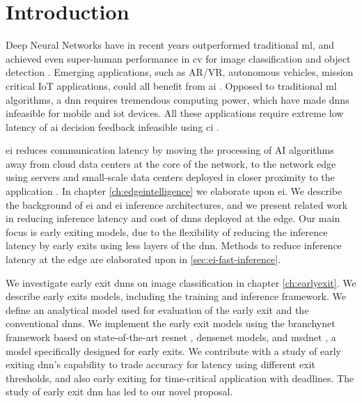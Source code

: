 \hypertarget{introduction}{%
\chapter{Introduction}\label{ch:introduction}}

Deep Neural Networks have in recent years outperformed traditional \gls{ml}, and achieved even super-human performance in \gls{cv} for image classification and object detection \cite{russakovsky_imagenet_2015}. Emerging applications, such as AR/VR, autonomous vehicles, mission critical IoT applications, could all benefit from \gls{ai} \cite{pettey_immersive_2018}. Opposed to traditional \gls{ml} algorithms, a \gls{dnn} requires tremendous computing power, which have made \gls{dnn}s infeasible for mobile and \gls{iot} devices. All these applications require extreme low latency of \gls{ai} decision feedback infeasible using \gls{ci} \cite{zhou_edge_2019}. 

\acrlong{ei} reduces communication latency by moving the processing of AI algorithms away from cloud data centers at the core of the network, to the network edge using servers and small-scale data centers deployed in closer proximity to the application \cite{shi_edge_2016}. In chapter \ref{ch:edgeintelligence} we elaborate upon \gls{ei}. We describe the background of \gls{ei} and \gls{ei} inference architectures, and we present related work in reducing inference latency and cost of \gls{dnn}s deployed at the edge. Our main focus is early exiting models, due to the flexibility of reducing the inference latency by early exits using less layers of the \gls{dnn}. Methods to reduce inference latency at the edge are elaborated upon in \ref{sec:ei-fast-inference}. 

We investigate early exit \gls{dnn}s on image classification in chapter \ref{ch:earlyexit}. We describe early exits models, including the training and inference framework. We define an analytical model used for evaluation of the early exit and the conventional \gls{dnn}s. We implement the early exit models using the \gls{branchynet} framework \cite{teerapittayanon_branchynet:_2016} based on state-of-the-art \gls{resnet} \cite{he_deep_2015}, \gls{densenet} \cite{huang_densely_2016} models, and \gls{msdnet} \cite{huang_multi-scale_2017}, a model specifically designed for early exits. We contribute with a study of early exiting \gls{dnn}'s capability to trade accuracy for latency using different exit thresholds, and also early exiting for time-critical application with deadlines. The study of early exit \gls{dnn} has led to our novel proposal.

